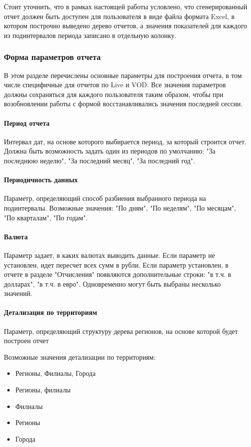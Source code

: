 Стоит уточнить, что в рамках настоящей работы условлено, что сгенерированный отчет должен быть доступен 
для пользователя в виде файла формата Excel, в котором построчно выведено дерево отчетов, а значения показателей
для каждого из подинтервалов периода записано в отдельную колонку.

\subsubsection{Форма параметров отчета}
В этом разделе перечислены основные параметры для построения отчета, в том числе специфичные для отчетов
по Live и VOD. Все значения параметров должны сохраняться для каждого пользователя таким образом,
чтобы при возобновлении работы с формой восстанавливались значения последней сессии.

\paragraph{Период отчета} Интервал дат, на основе которого выбирается период, за который строится отчет.
Должна быть возможность задать один из периодов по умолчанию: "За последнюю неделю", "За последний месяц",
"За последний год".

\paragraph{Периодичность данных} Параметр, определяющий способ разбиения выбранного периода на подинтервалы.
Возможные значения: "По дням", "По неделям", "По месяцам", "По кварталам", "По годам".

\paragraph{Валюта} Параметр задает, в каких валютах выводить данные. 
Если параметр не установлен, идет пересчет всех сумм в рубли. 
Если параметр установлен, в отчете в разделе "Отчисления" появляются дополнительные строки: "в т.ч. в долларах", 
"в т.ч. в евро". Одновременно могут быть выбраны несколько значений.

\paragraph{Детализация по территориям} Параметр, определяющий структуру дерева регионов, на основе
которой будет построен отчет

Возможные значения детализации по территориям:
\begin{itemize}
\item{
Регионы, Филиалы, Города
}
\item{
Регионы, филиалы
}
\item{
Филиалы
}
\item{
Регионы
}
\item{
Города
}
\end{itemize}

